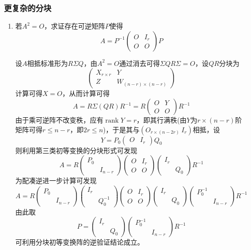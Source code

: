\documentclass[a4paper,UTF8,fontset=windows]{ctexart}
\DeclareMathOperator{\rank}{rank}
\begin{document}
\subsubsection{更复杂的分块}
\begin{enumerate}
    \item 若$A^2=O$，求证存在可逆矩阵$P$使得
    $$A=P^{-1}\begin{pmatrix}O&I_r\\O&O\end{pmatrix}P$$

    设$A$相抵标准形为$R\Sigma Q$，由$A^2=O$通过消去可得$\Sigma QR\Sigma=O$，设$QR$分块为
    $$\begin{pmatrix}X_{r\times r}&Y\\Z&W_{(n-r)\times(n-r)}\end{pmatrix}$$
    计算可得$X=O$，从而计算可得
    $$A=R\Sigma(QR)R^{-1}=R\begin{pmatrix}O&Y\\O&O\end{pmatrix}R^{-1}$$
    由于乘可逆阵不改变秩，应有$\rank Y=r$，即其行满秩(由$Y$为$r\times(n-r)$阶矩阵可得$r\le n-r$，即$2r\le n$)，于是其与$(O_{r\times (n-2r)}\ I_r)$相抵，设
    $$Y=P_0\begin{pmatrix}O&I_r\end{pmatrix}Q_0$$
    则利用第三类初等变换的分块形式可发现
    $$A=R\begin{pmatrix}P_0\\ &I_{n-r}\end{pmatrix}\begin{pmatrix}O&I_r\\O&O\end{pmatrix}\begin{pmatrix}I_r\\ &Q_0\end{pmatrix}R^{-1}$$
    为配凑逆进一步计算可发现
    $$A=R\begin{pmatrix}P_0\\ &I_{n-r}\end{pmatrix}\begin{pmatrix}I_r\\ &Q_0^{-1}\end{pmatrix}\begin{pmatrix}O&I_r\\O&O\end{pmatrix}\begin{pmatrix}I_r\\ &Q_0\end{pmatrix}\begin{pmatrix}P_0^{-1}\\ &I_{n-r}\end{pmatrix}R^{-1}$$
    由此取
    $$P=\begin{pmatrix}I_r\\ &Q_0\end{pmatrix}\begin{pmatrix}P_0^{-1}\\ &I_{n-r}\end{pmatrix}R^{-1}$$
    可利用分块初等变换阵的逆验证结论成立。


\end{enumerate}
\end{document}
